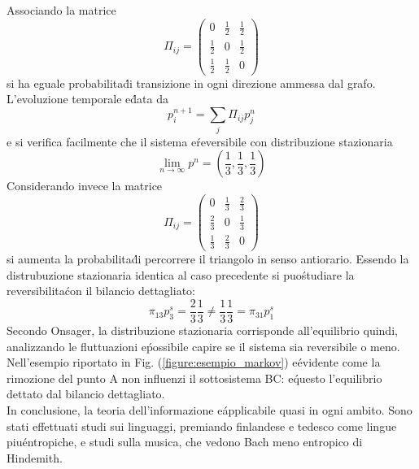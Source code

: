\documentclass[12pt, a4paper]{book}
\theoremstyle{theorem}
\begin{document}
				Associando la matrice
				\begin{equation*}
					\Pi_{ij} = 
						\begin{pmatrix}
							0 & \frac{1}{2} & \frac{1}{2} \\
							\frac{1}{2} & 0 & \frac{1}{2} \\
							\frac{1}{2} & \frac{1}{2} & 0 
						\end{pmatrix}
				\end{equation*}
				si ha eguale probabilita\' di transizione in ogni direzione ammessa dal grafo.
				L'evoluzione temporale e\' data da
				\begin{equation*}
					p_i^{n+1}=\sum_j\Pi_{ij}p_j^n
				\end{equation*}
				e si verifica facilmente che il sistema e\' reversibile con distribuzione stazionaria
				\begin{equation*}
					\lim_{n\to\infty}p^n=\left(\frac{1}{3},\frac{1}{3},\frac{1}{3}\right)
				\end{equation*}
				Considerando invece la matrice
				\begin{equation*}
					\Pi_{ij} = 
						\begin{pmatrix}
							0 & \frac{1}{3} & \frac{2}{3} \\
							\frac{2}{3} & 0 & \frac{1}{3} \\
							\frac{1}{3} & \frac{2}{3} & 0 
						\end{pmatrix}
				\end{equation*}
				si aumenta la probabilita\' di percorrere il triangolo in senso antiorario.
				Essendo la distrubuzione stazionaria identica al caso precedente si puo\' studiare la reversibilita\' con il bilancio dettagliato:
				\begin{equation*}
					\pi_{13}p_3^s = \frac{2}{3} \frac{1}{3} \neq \frac{1}{3}\frac{1}{3} = \pi_{31}p_1^s
				\end{equation*}
				Secondo Onsager, la distribuzione stazionaria corrisponde all'equilibrio quindi, analizzando le fluttuazioni e\' possibile capire se il sistema sia reversibile o meno.
				Nell'esempio riportato in Fig. (\ref{figure:esempio_markov}) e\' evidente come la rimozione del punto A non influenzi il sottosistema BC: e\' questo l'equilibrio dettato dal bilancio dettagliato.
				\\
				In conclusione, la teoria dell'informazione e\' applicabile quasi in ogni ambito.
				Sono stati effettuati studi sui linguaggi, premiando finlandese e tedesco come lingue piu\' entropiche, e studi sulla musica, che vedono Bach meno entropico di Hindemith.
		
\end{document}
